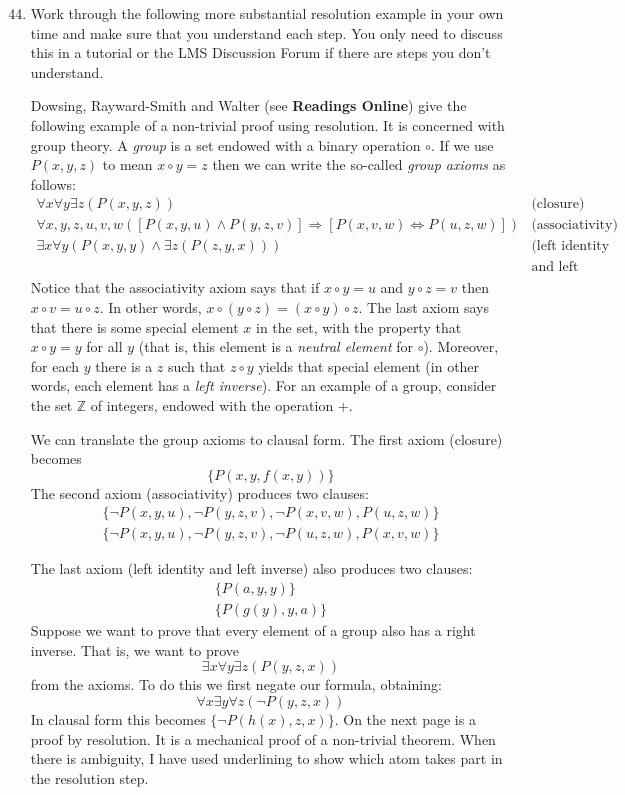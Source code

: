 \documentclass[11pt]{article}
\newcommand{\impl}{\mathbin{\Rightarrow}}
\newcommand{\biim}{\mathbin{\Leftrightarrow}}
\begin{document}
\begin{enumerate}
\setcounter{enumi}{43}
\item
Work through the following more substantial resolution
example in your own time
and make sure that you understand each step.
You only need to discuss this in a tutorial or the LMS Discussion 
Forum if there are steps you don't understand.

Dowsing, Rayward-Smith and Walter (see {\bf Readings Online})
give the following example of a non-trivial proof using resolution.
It is concerned with group theory.
A \emph{group} is a set endowed with a binary operation $\circ$.
If we use $P(x,y,z)$ to mean $x \circ y = z$ then we can
write the so-called \emph{group axioms} as follows:
\[
\begin{array}{lr}
   \forall x \forall y \exists z (P(x,y,z)) & \mbox{(closure)}
\\ \forall x, y, z, u, v, w
        \left([P(x,y,u) \land P(y,z,v)] \impl [P(x,v,w) \biim P(u,z,w)]\right)
   & \mbox{(associativity)}
\\ \exists x \forall y (P(x,y,y) \land \exists z (P(z,y,x)))
   & \mbox{(left identity}
\\ & \mbox{and left inverse)}
\end{array}
\]
Notice that the associativity axiom says that if $x \circ y = u$ and
$y \circ z = v$ then $x \circ v = u \circ z$.
In other words, $x \circ (y \circ z) = (x \circ y) \circ z$.
The last axiom says that there is some special element $x$ in
the set, with the property that $x \circ y = y$ for all $y$
(that is, this element is a \emph{neutral element} for $\circ$).
Moreover, for each $y$ there is a $z$ such that $z \circ y$
yields that special element
(in other words, each element has a \emph{left inverse}).
For an example of a group, consider the set $\mathbb{Z}$
of integers, endowed with the operation $+$.

We can translate the group axioms to clausal form.
The first axiom (closure) becomes
\[
  \{P(x,y,f(x,y))\}
\]
The second axiom (associativity) produces two clauses:
\[
\begin{array}{l}
   \{\neg P(x,y,u), \neg P(y,z,v), \neg P(x,v,w), P(u,z,w)\}
\\ \{\neg P(x,y,u), \neg P(y,z,v), \neg P(u,z,w), P(x,v,w)\}
\end{array}
\]

The last axiom (left identity and left inverse) also produces two clauses:
\[
\begin{array}{l}
   \{P(a,y,y)\}
\\ \{P(g(y),y,a)\}
\end{array}
\]
Suppose we want to prove that every element of a group also
has a right inverse.
That is, we want to prove
\[
  \exists x \forall y \exists z (P(y,z,x))
\]
from the axioms.
To do this we first negate our formula, obtaining:
\[
  \forall x \exists y \forall z (\neg P(y,z,x))
\]
In clausal form this becomes $\{\neg P(h(x),z,x)\}$.
On the next page is a proof by resolution.
It is a mechanical proof of a non-trivial theorem.
When there is ambiguity, I have used underlining to show which
atom takes part in the resolution step.


\end{enumerate}
\end{document}
